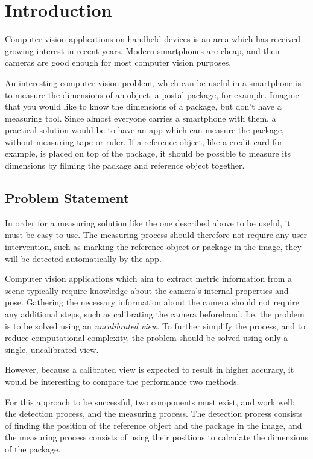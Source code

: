 \chapter{Introduction}
Computer vision applications on handheld devices is an area which has received growing interest in recent years. 
Modern smartphones are cheap, and their cameras are good enough for most computer vision purposes.

An interesting computer vision problem, which can be useful in a smartphone is to measure the dimensions of an object, a postal package, for example.
Imagine that you would like to know the dimensions of a package, but don't have a measuring tool.
Since almost everyone carries a smartphone with them, a practical solution would be to have an app which can measure the package, without measuring tape or ruler.
If a reference object, like a credit card for example, is placed on top of the package, it should be possible to measure its dimensions by filming the package and reference object together.

\section{Problem Statement}\label{problem-statement}
In order for a measuring solution like the one described above to be useful, it must be easy to use. 
The measuring process should therefore not require any user intervention, such as marking the reference object or package in the image, they will be detected automatically by the app.

Computer vision applications which aim to extract metric information from a scene typically require knowledge about the camera's internal properties and pose.
Gathering the necessary information about the camera should not require any additional steps, such as calibrating the camera beforehand.
I.e. the problem is to be solved using an \textit{uncalibrated view}.
To further simplify the process, and to reduce computational complexity, the problem should be solved using only a single, uncalibrated view.

However, because a calibrated view is expected to result in higher accuracy, it would be interesting to compare the performance two methods.

For this approach to be successful, two components must exist, and work well: the detection process, and the measuring process. %
The detection process consists of finding the position of the reference object and the package in the image, and the measuring process consists of using their positions to calculate the dimensions of the package.

